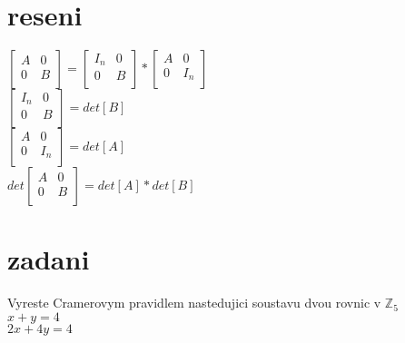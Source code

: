 \documentclass[a4paper]{article}
\begin{document}
\section*{reseni}
$
\left[ \begin{matrix} 
	A & 0 \\
	0 & B \\
\end{matrix} \right] =
\left[ \begin{matrix} 
	I_n & 0 \\
	0 & B \\
\end{matrix} \right] *
\left[ \begin{matrix} 
	A & 0 \\
	0 & I_n \\
\end{matrix} \right]
$\\
$
\left[ \begin{matrix} 
	I_n & 0 \\
	0 & B \\
\end{matrix} \right] = det[B]
$\\
$
\left[ \begin{matrix} 
	A & 0 \\
	0 & I_n \\
\end{matrix} \right] = det[A]
$\\
$
det \left[ \begin{matrix} 
	A & 0 \\
	0 & B \\
\end{matrix} \right] = det[A] * det[B]
$



\section*{zadani}
Vyreste Cramerovym pravidlem nastedujici soustavu dvou rovnic v $\mathbb{Z}_5$\\
$x+y=4$\\
$2x+4y=4$
\end{document}
